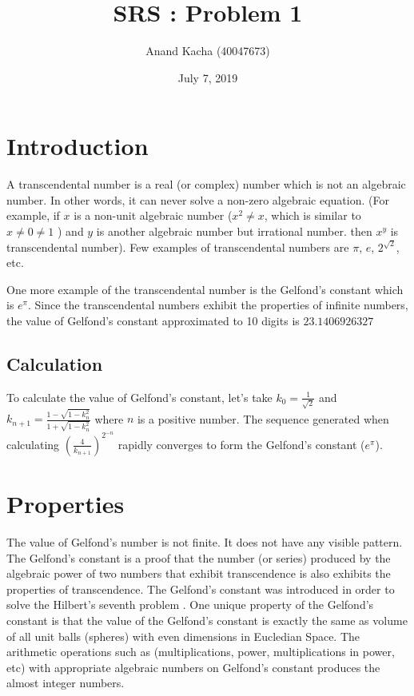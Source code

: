 \documentclass{article}
\title{SRS : Problem 1}
\author{Anand Kacha (40047673)}
\date{July 7, 2019}
\begin{document}
\maketitle

\section{Introduction}
\justifying
A transcendental number \cite{transcendental} is a real (or complex) number which is not an algebraic number. In other words, it can never solve a non-zero algebraic equation. (For example, if $x$ is a non-unit algebraic number ($x^2 \ne x$, which is similar to $x \ne 0 \ne 1$ ) and $y$ is another algebraic number but irrational number. then $x^y$ is transcendental number). Few examples of transcendental numbers are $\pi$, $e$, $2^{\sqrt{2}}$, etc.
\begin{flushleft}
\justifying
One more example of the transcendental number is the Gelfond's constant \cite{gelfondsconstant} which is $e^{\pi}$. Since the transcendental numbers exhibit the properties of infinite numbers, the value of Gelfond's constant approximated to 10 digits is $23.1406926327$
\end{flushleft}

\subsection{Calculation}
\begin{flushleft}
\justifying
To calculate the value of Gelfond's constant, let's take $k_0 = \frac{1}{\sqrt{2}}$ and $k_{n+1} = \frac{1 - \sqrt{1 - k_n^2}}{1 + \sqrt{1 - k_n^2}}$ where $n$ is a positive number. The sequence generated when calculating $(\frac{4}{k_{n+1}})^{2^{-n}}$ rapidly converges to form the Gelfond's constant ($e^\pi$).
\end{flushleft}

\section{Properties}
\begin{flushleft}
\justifying
The value of Gelfond's number is not finite. It does not have any visible pattern. The Gelfond's constant is a proof that the number (or series) produced by the algebraic power of two numbers that exhibit transcendence is also exhibits the properties of transcendence. The Gelfond's constant was introduced in order to solve the Hilbert's seventh problem \cite{hilbertsproblems}. One unique property of the Gelfond's constant is that the value of the Gelfond's constant is exactly the same as volume of all unit balls (spheres) with even dimensions in Eucledian Space. The arithmetic operations such as (multiplications, power, multiplications in power, etc) with appropriate algebraic numbers on Gelfond's constant produces the almost integer numbers.
\end{flushleft}
\end{document}
